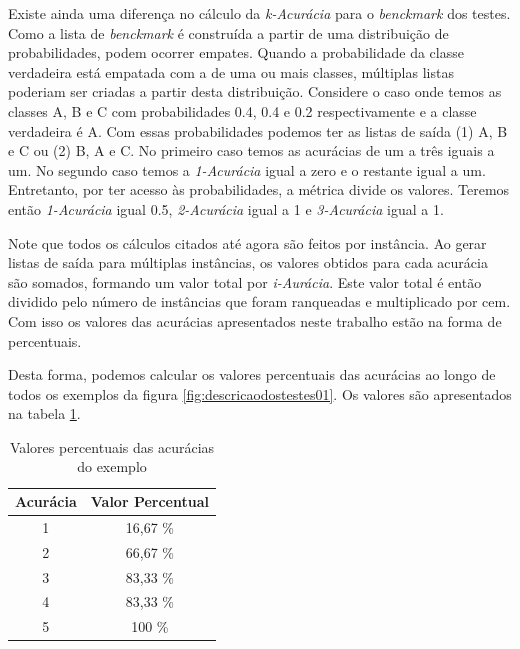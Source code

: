 Existe ainda uma diferença no cálculo da \textit{k-Acurácia} para o \textit{benckmark} dos testes.
Como a lista de \textit{benckmark} é construída a partir de uma distribuição de probabilidades, podem ocorrer empates.
Quando a probabilidade da classe verdadeira está empatada com a de uma ou mais classes, múltiplas listas poderiam ser criadas a partir desta distribuição.
Considere o caso onde temos as classes A, B e C com probabilidades 0.4, 0.4 e 0.2 respectivamente e a classe verdadeira é A.
Com essas probabilidades podemos ter as listas de saída (1) A, B e C ou (2) B, A e C.
No primeiro caso temos as acurácias de um a três iguais a um.
No segundo caso temos a \textit{1-Acurácia} igual a zero e o restante igual a um.
Entretanto, por ter acesso às probabilidades, a métrica divide os valores.
Teremos então \textit{1-Acurácia} igual 0.5, \textit{2-Acurácia} igual a 1 e \textit{3-Acurácia} igual a 1.

Note que todos os cálculos citados até agora são feitos por instância. 
Ao gerar listas de saída para múltiplas instâncias, os valores obtidos para cada acurácia são somados, formando um valor total por \textit{i-Aurácia}.
Este valor total é então dividido pelo número de instâncias que foram ranqueadas e multiplicado por cem.
Com isso os valores das acurácias apresentados neste trabalho estão na forma de percentuais.

Desta forma, podemos calcular os valores percentuais das acurácias ao longo de todos os exemplos da figura \ref{fig:descricaodostestes01}.
Os valores são apresentados na tabela \ref{tab:valoresacuraciasexemplo}.

\begin{table}[h!]
  \begin{center}
    \begin{tabular}{cc}
      \hline
      \textbf{Acurácia} & \textbf{Valor Percentual} \\
      \hline

      1 & 16,67 \% \\
      2 & 66,67 \% \\
      3 & 83,33 \% \\
      4 & 83,33 \% \\
      5 & 100 \% \\

      \hline
    \end{tabular}
    \caption{Valores percentuais das acurácias do exemplo}
    \label{tab:valoresacuraciasexemplo}
  \end{center}
\end{table}

